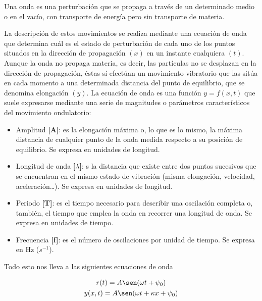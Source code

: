 \documentclass[twocolumn, 12pt]{article}
\begin{document}
Una onda es una perturbación que se propaga a través de un
determinado medio o en el vacío, con transporte de energía
pero sin transporte de materia.

La descripción de estos movimientos se realiza mediante una
ecuación de onda que determina cuál es el estado de
perturbación de cada uno de los puntos situados en la
dirección de propagación $(x)$ en un instante cualquiera
$(t)$. Aunque la onda no propaga materia, es decir, las
partículas no se desplazan en la dirección de propagación,
éstas sí efectúan un movimiento vibratorio que las sitúa en
cada momento a una determinada distancia del punto de
equilibrio, que se denomina elongación $(y)$. La ecuación
de onda es una función $y = f(x,t)$ que suele expresarse
mediante una serie de magnitudes o parámetros
característicos del movimiento ondulatorio:

\begin{itemize}[label=$\rightharpoonup$]
    \item Amplitud \textbf{[A]}: es la elongación máxima o, lo que es
          lo mismo, la máxima distancia de cualquier punto de la onda
          medida respecto a su posición de equilibrio. Se expresa en
          unidades de longitud.

    \item Longitud de onda \textbf{[$\lambda$]}: s la distancia que
          existe entre dos puntos sucesivos que se encuentran en el
          mismo estado de vibración (misma elongación, velocidad,
          aceleración…). Se expresa en unidades de longitud.

    \item Periodo \textbf{[T]}: es el tiempo necesario para describir
          una oscilación completa o, también, el tiempo que emplea la
          onda en recorrer una longitud de onda. Se expresa en
          unidades de tiempo.

    \item Frecuencia \textbf{[f]}: es el número de oscilaciones por
          unidad de tiempo. Se expresa en Hz ($s^{-1}$).
\end{itemize}

Todo esto nos lleva a las siguientes ecuaciones de
onda~\cite{Tomé_2018}

\begin{equation*}
    \begin{gathered}
        r(t) = A \sen(\omega t + \psi_{0}) \\
        y(x, t) = A \sen(\omega t + \kappa x + \psi_{0}) \\
    \end{gathered}
\end{equation*}
\end{document}
